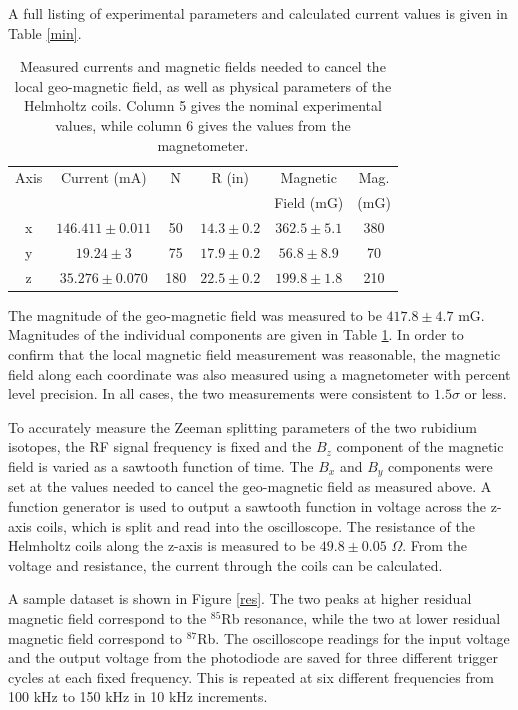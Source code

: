 A full listing of experimental parameters and calculated current values is given in Table \ref{min}. 

\begin{table}[h]
\caption{\label{bfield} Measured currents and magnetic fields needed to cancel the local geo-magnetic field, as well as physical parameters of the Helmholtz coils. Column 5 gives the nominal experimental values, while column 6 gives the values from the magnetometer. }
\begin{tabular}{|c|c|c|c|c|c|}
\hline
Axis & Current (mA) & N & R (in) & Magnetic  & Mag. \\
& & & & Field (mG) & (mG)\\
\hline
x & $146.411\pm0.011$ & 50 & $14.3\pm0.2$ & $362.5\pm 5.1$ & 380\\
\hline
y & $19.24\pm3$ & 75 & $17.9\pm0.2$ & $56.8\pm8.9$ & 70 \\
\hline
z &  $35.276\pm 0.070$ & 180 & $22.5\pm0.2$ & $199.8\pm1.8$ & 210\\
\hline
\end{tabular}
\end{table}

The magnitude of the geo-magnetic field was measured to be $417.8\pm4.7$ mG. Magnitudes of the individual components are given in Table \ref{bfield}. In order to confirm that the local magnetic field measurement was reasonable, the magnetic field along each coordinate was also measured using a magnetometer with percent level precision. In all cases, the two measurements were consistent to $1.5\sigma$ or less. 



To accurately measure the Zeeman splitting parameters of the two rubidium isotopes, the RF signal frequency is fixed and the $B_z$ component of the magnetic field is varied as a sawtooth function of time. The $B_x$ and $B_y$ components were set at the values needed to cancel the geo-magnetic field as measured above. A function generator is used to output a sawtooth function in voltage across the z-axis coils, which is split and read into the oscilloscope. The resistance of the Helmholtz coils along the z-axis is measured to be $49.8\pm0.05$ $\Omega$. From the voltage and resistance, the current through the coils can be calculated. 

A sample dataset is shown in Figure \ref{res}. The two peaks at higher residual magnetic field correspond to the $^{85}$Rb resonance, while the two at lower residual magnetic field correspond to $^{87}$Rb. The oscilloscope readings for the input voltage and the output voltage from the photodiode are saved for three different trigger cycles at each fixed frequency. This is repeated at six different frequencies from 100 kHz to 150 kHz in 10 kHz increments.

